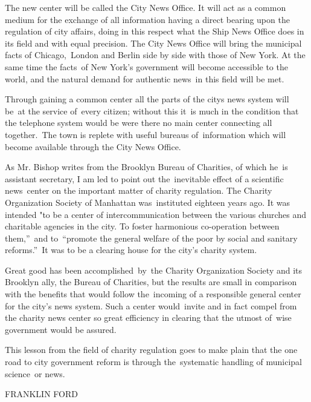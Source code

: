 \documentclass[twoside,symmetric,nobib,justified]{tufte-book}
\begin{document}
The new center will be called the City News Office. It will act as a
common medium for the exchange of all information having a direct
bearing upon the regulation of city affairs, doing in this respect what
the Ship News Office does in its field and with equal precision. The
City News Office will bring the municipal facts of Chicago,~London and
Berlin side by side with those of New York. At the same time the
facts~of New York's government will become accessible to the world, and
the natural demand for authentic news~in this field will be met.~

Through gaining a common center all the parts of the
city\textquotesingle s news system will be~at the service of~every
citizen; without this it~is much in the condition that the telephone
system would be were there no main center connecting all together.~The
town is replete with useful bureaus of~information which will become
available through the City News Office.~

As Mr. Bishop writes from the Brooklyn Bureau of Charities, of which
he~is assistant secretary, I am led to point out the~inevitable effect
of a scientific news~center on the important matter of charity
regulation. The Charity Organization Society of Manhattan was~instituted
eighteen years ago. It was intended "to be a center of
intercommunication between the various churches and charitable agencies
in the city. To foster harmonious co-operation between them,''~and
to~``promote the general welfare of the poor by social and sanitary
reforms.''~It was to be a clearing house for the city's charity system.~

Great good has been accomplished~by~the Charity Organization Society and
its Brooklyn ally, the Bureau of Charities, but the results are small in
comparison with the benefits that would follow the~incoming of a
responsible general center for the city's news system. Such a center
would~invite and in fact compel from the charity news center so great
efficiency in clearing that the utmost of~wise government would be
assured.~

This lesson from the field of charity regulation goes to make plain that
the one road to city government reform is through the~systematic
handling of municipal science~or news. ~

\vspace{0.15in}

\hfill{\Large FRANKLIN FORD}

\vspace{0.1in}
\end{document}
